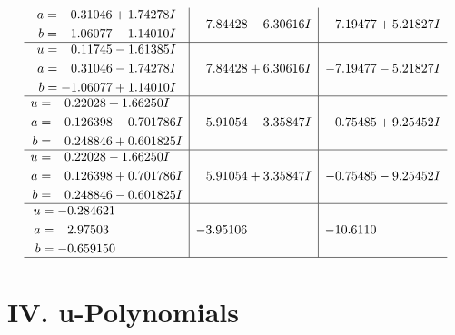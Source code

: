 \documentclass[1p]{elsarticle_modified}
\theoremstyle{definition}
\begin{document}
$$\begin{array}{c|c|c}
\begin{aligned}
a &= \phantom{-}0.31046 + 1.74278 I \\
b &= -1.06077 - 1.14010 I\end{aligned}
 & \phantom{-}7.84428 - 6.30616 I & -7.19477 + 5.21827 I \\ \hline\begin{aligned}
u &= \phantom{-}0.11745 - 1.61385 I \\
a &= \phantom{-}0.31046 - 1.74278 I \\
b &= -1.06077 + 1.14010 I\end{aligned}
 & \phantom{-}7.84428 + 6.30616 I & -7.19477 - 5.21827 I \\ \hline\begin{aligned}
u &= \phantom{-}0.22028 + 1.66250 I \\
a &= \phantom{-}0.126398 - 0.701786 I \\
b &= \phantom{-}0.248846 + 0.601825 I\end{aligned}
 & \phantom{-}5.91054 - 3.35847 I & -0.75485 + 9.25452 I \\ \hline\begin{aligned}
u &= \phantom{-}0.22028 - 1.66250 I \\
a &= \phantom{-}0.126398 + 0.701786 I \\
b &= \phantom{-}0.248846 - 0.601825 I\end{aligned}
 & \phantom{-}5.91054 + 3.35847 I & -0.75485 - 9.25452 I \\ \hline\begin{aligned}
u &= -0.284621\phantom{ +0.000000I} \\
a &= \phantom{-}2.97503\phantom{ +0.000000I} \\
b &= -0.659150\phantom{ +0.000000I}\end{aligned}
 & -3.95106\phantom{ +0.000000I} & -10.6110\phantom{ +0.000000I}\\
 \hline 
 \end{array}$$\newpage
\newpage\renewcommand{\arraystretch}{1}
\centering \section*{ IV. u-Polynomials}
\end{document}

